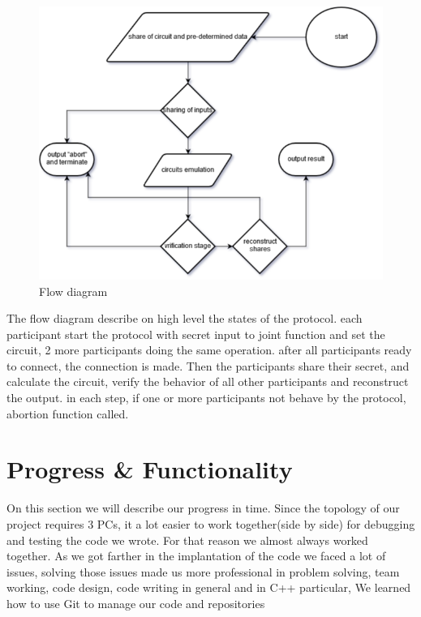 \documentclass[12pt]{article}
\begin{document}
\hfill\break\hfill\break
\begin{figure}[h]
	\centering
	\includegraphics[width=0.9\linewidth]{"../Figures/High-level flow chart"}
	\caption{Flow diagram}
	\label{fig:high-level-flow-chart}
\end{figure}

The flow diagram describe on high level the states of the protocol.
each participant start the protocol with secret input to joint function and set the circuit, 2 more participants doing the same operation. after all participants ready to connect, the connection is made. Then the participants share their secret, and calculate the circuit, verify the behavior of all other participants and reconstruct the output. in each step, if one or more participants not behave by the protocol, abortion function called.

\pagebreak

\section{Progress \& Functionality}
On this section we will describe our progress in time.
Since the topology of our project requires 3 PCs, it a lot easier to work together(side by side) for debugging and testing the code we wrote. For that reason we almost always worked together.
As we got farther in the implantation of the code we faced a lot of issues, solving those issues made us more professional in problem solving, team working, code design, code writing in general and in C++ particular, We learned how to use Git to manage our code and repositories
\end{document}
